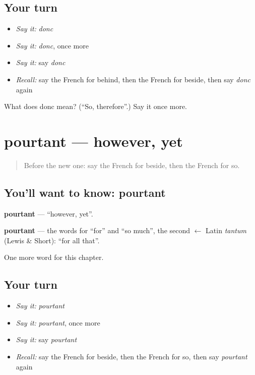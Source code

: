 \subsection*{Your turn}
\begin{itemize}
\raggedright
  \item \emph{Say it:} \emph{donc}
  \item \emph{Say it:} \emph{donc}, once more
  \item \emph{Say it:} say \emph{donc}
  \item \emph{Recall:} say the French for behind, then the French for beside, then say \emph{donc} again
\end{itemize}

\begin{tcolorbox}[breakable,colback=teal!4,colframe=teal!35!black,title={Before you move on}]
What does donc mean? (\textquotedblleft{}So, therefore\textquotedblright{}.) Say it once more.
\end{tcolorbox}
\section[pourtant]{pourtant — however, yet}

\label{lesson:FR-C158-pourtant}



\begin{quote}
Before the new one: say the French for beside, then the French for so.
\end{quote}

\subsection*{You'll want to know: pourtant}
\textbf{pourtant} — \textquotedblleft{}however, yet\textquotedblright{}.

\begin{cousinweb}
\textbf{pourtant} — the words for \textquotedblleft{}for\textquotedblright{} and \textquotedblleft{}so much\textquotedblright{}, the second $\leftarrow$ Latin \emph{tantum} (Lewis \& Short): \textquotedblleft{}for all that\textquotedblright{}.
\end{cousinweb}

\begin{grammarlens}[title={What you've built}]
One more word for this chapter.
\end{grammarlens}

\subsection*{Your turn}
\begin{itemize}
\raggedright
  \item \emph{Say it:} \emph{pourtant}
  \item \emph{Say it:} \emph{pourtant}, once more
  \item \emph{Say it:} say \emph{pourtant}
  \item \emph{Recall:} say the French for beside, then the French for so, then say \emph{pourtant} again
\end{itemize}

